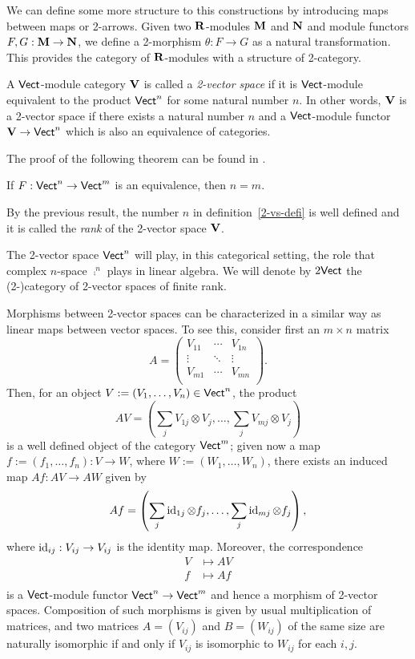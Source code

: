 We can define some more structure to this constructions by introducing maps between maps or 2-arrows. Given two ${\bf R}$-modules ${\bf M}$ and ${\bf N}$ and module functors $F,G:{\bf M}\to {\bf N}$, we define a 2-morphism $\theta :F\to G$ as a natural transformation. This provides the category of ${\bf R}$-modules with a structure of 2-category.

\begin{defi}\label{2-vs-defi}
  A $\mathsf{Vect}$-module category ${\bf V}$ is called a \emph{2-vector
    space} if it is $\mathsf{Vect}$-module equivalent to the
  product $\mathsf{Vect}^n$ for some natural number $n$. In other words, ${\bf V}$ is a 2-vector space if there exists a natural number $n$ and a $\mathsf{Vect}$-module functor ${\bf V}\to \mathsf{Vect}^n$ which is also an equivalence of categories. 
\end{defi}

The proof of the following theorem can be found in \cite{kn:kv}.

\begin{theorem}\label{prop-10}
  If $F: \mathsf{Vect}^n \rightarrow \mathsf{Vect}^m$ is an equivalence,
  then $n =m$.
\end{theorem}

By the previous result, the number $n$ in definition~\ref{2-vs-defi} is well defined and it is
called the \emph{rank} of the 2-vector space ${\bf V}$.

The 2-vector space $\mathsf{Vect}^n$ will play, in this categorical
setting, the role that complex $n$-space $\comp^n$ plays in linear algebra.
We will denote by $2\mathsf{Vect}$ the (2-)category of
2-vector spaces of finite rank.

Morphisms between 2-vector spaces can be characterized in a similar way as linear maps between vector spaces. To see this, consider first an $m\times n$ matrix
$$A=\begin{pmatrix}
V_{11} & \cdots & V_{1n} \\
\vdots & \ddots & \vdots \\
V_{m1} & \cdots & V_{mn} \\
\end{pmatrix}.
$$
Then, for an object $V:=(V_1,\dots ,V_n) \in \mathsf{Vect}^n$, the product
$$AV=\left (\sum_jV_{1j}\otimes V_j,\dots ,\sum_jV_{mj}\otimes V_j\right )$$
is a well defined object of the category $\mathsf{Vect}^m$; given now a map $f:=(f_1,\dots ,f_n):V\to W$, where $W:=(W_1,\dots ,W_n)$, there exists an induced map $Af:AV\to AW$ given by
$$Af=\left (\sum_j\operatorname{id}_{1j}\otimes f_j,\dots ,\sum_j\operatorname{id}_{mj}\otimes f_j\right ),$$
where $\operatorname{id}_{ij}:V_{ij}\to V_{ij}$ is the identity map. Moreover, the correspondence
$$
\begin{aligned}
V &\mapsto AV \\
f &\mapsto Af \\
\end{aligned}
$$
is a $\mathsf{Vect}$-module functor $\mathsf{Vect}^n\to \mathsf{Vect}^m$ and hence a morphism of 2-vector spaces. Composition of such morphisms is given by usual multiplication of matrices, and two matrices $A=(V_{ij})$ and $B=(W_{ij})$ of the same size are naturally isomorphic if and only if $V_{ij}$ is isomorphic to $W_{ij}$ for each $i,j$. 

